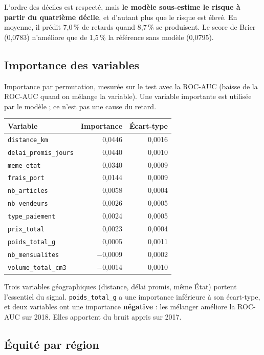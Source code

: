 \documentclass[11pt,a4paper]{article}
\newcommand{\var}[1]{\texttt{#1}}
\begin{document}
L'ordre des déciles est respecté, mais \textbf{le modèle sous-estime le risque à partir du
quatrième décile}, et d'autant plus que le risque est élevé. En moyenne, il prédit 7,0\,\% de
retards quand 8,7\,\% se produisent. Le score de Brier (0,0783) n'améliore que de 1,5\,\% la
référence sans modèle (0,0795).

\subsection{Importance des variables}

Importance par permutation, mesurée sur le test avec la ROC-AUC (baisse de la ROC-AUC quand on
mélange la variable). Une variable importante est utilisée par le modèle ; ce n'est pas une
cause du retard.

\begin{center}
\begin{tabular}{@{}lrr@{}}
\toprule
Variable & Importance & Écart-type \\
\midrule
\var{distance\_km} & 0,0446 & 0,0016 \\
\var{delai\_promis\_jours} & 0,0440 & 0,0010 \\
\var{meme\_etat} & 0,0340 & 0,0009 \\
\var{frais\_port} & 0,0144 & 0,0009 \\
\var{nb\_articles} & 0,0058 & 0,0004 \\
\var{nb\_vendeurs} & 0,0026 & 0,0005 \\
\var{type\_paiement} & 0,0024 & 0,0005 \\
\var{prix\_total} & 0,0023 & 0,0004 \\
\var{poids\_total\_g} & 0,0005 & 0,0011 \\
\textcolor{sinistre}{\var{nb\_mensualites}} & \textcolor{sinistre}{$-$0,0009} & 0,0002 \\
\textcolor{sinistre}{\var{volume\_total\_cm3}} & \textcolor{sinistre}{$-$0,0014} & 0,0010 \\
\bottomrule
\end{tabular}
\end{center}

Trois variables géographiques (distance, délai promis, même État) portent l'essentiel du
signal. \var{poids\_total\_g} a une importance inférieure à son écart-type, et deux variables
ont une importance \textbf{négative} : les mélanger améliore la ROC-AUC sur 2018. Elles
apportent du bruit appris sur 2017.

\subsection{Équité par région}
\end{document}

